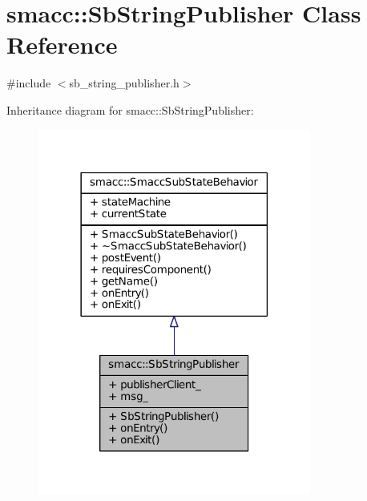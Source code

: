 \hypertarget{classsmacc_1_1SbStringPublisher}{}\section{smacc\+:\+:Sb\+String\+Publisher Class Reference}
\label{classsmacc_1_1SbStringPublisher}


{\ttfamily \#include $<$sb\+\_\+string\+\_\+publisher.\+h$>$}



Inheritance diagram for smacc\+:\+:Sb\+String\+Publisher\+:
\nopagebreak
\begin{figure}[H]
\begin{center}
\leavevmode
\includegraphics[width=254pt]{classsmacc_1_1SbStringPublisher__inherit__graph}
\end{center}
\end{figure}


